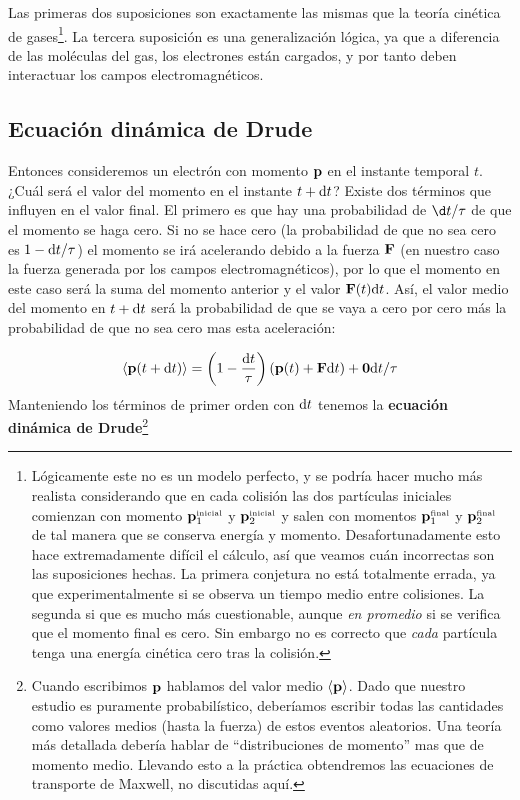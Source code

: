 Las primeras dos suposiciones son exactamente las mismas que la teoría cinética de gases\footnote{Lógicamente este no es un modelo perfecto, y se podría hacer mucho más realista considerando que en cada colisión las dos partículas iniciales comienzan con momento $\mathbf{p}_1^{\text{{\tiny inicial}}}$ y $\mathbf{p}_2^{\text{{\tiny inicial}}}$ y salen con momentos $\mathbf{p}_1^{\text{{\tiny final}}}$ y $\mathbf{p}_2^{\text{{\tiny final}}}$ de tal manera que se conserva energía y momento. Desafortunadamente esto hace extremadamente difícil el cálculo, así que veamos cuán incorrectas son las suposiciones hechas. La primera conjetura no está totalmente errada, ya que experimentalmente si se observa un tiempo medio entre colisiones. La segunda si que es mucho más cuestionable, aunque \textit{en promedio} si se verifica  que el momento final es cero. Sin embargo no es correcto que \textit{cada} partícula tenga una energía cinética cero tras la colisión.}. La tercera suposición es una generalización lógica, ya que a diferencia de las moléculas del gas, los electrones están cargados, y por tanto deben interactuar los campos electromagnéticos.

\subsection{Ecuación dinámica de Drude}

Entonces consideremos un electrón con momento $\mathbf{p}$ en el instante temporal $t$. ¿Cuál será el valor del momento en el instante $t+\mathrm{d} t$? Existe dos términos que influyen en el valor final. El primero es que hay una probabilidad de $\d t/\tau$ de que el momento se haga cero. Si no se hace cero (la probabilidad de que no sea cero es $1-\mathrm{d} t / \tau$) el momento se irá acelerando debido a la fuerza $\mathbf{F}$ (en nuestro caso la fuerza generada por los campos electromagnéticos), por lo que el momento en este caso será la suma del momento anterior y el valor $\mathbf{F}(t)\mathrm{d} t$. Así, el valor medio del momento en $t+\mathrm{d} t$ será la probabilidad de que se vaya a cero por cero más la probabilidad de que no sea cero mas esta aceleración:

\begin{equation}
	\langle \mathbf{p} (t + \mathrm{d} t) \rangle = \left( 1- \frac{\mathrm{d} t}{\tau} \right) \left( \mathbf{p} (t)+\mathbf{F} \mathrm{d} t \right) + \mathbf{0} \mathrm{d} t / \tau
\end{equation}
Manteniendo los términos de primer orden con $\mathrm{d} t$ tenemos la \textbf{ecuación dinámica de Drude}\footnote{Cuando escribimos $\mathbf{p}$ hablamos del valor medio $\langle \mathbf{p} \rangle$. Dado que nuestro estudio es puramente probabilístico, deberíamos escribir todas las cantidades como valores medios (hasta la fuerza) de estos eventos aleatorios. Una teoría más detallada debería hablar de ``distribuciones de momento'' mas que de momento medio. Llevando esto a la práctica obtendremos las ecuaciones de transporte de Maxwell, no discutidas aquí.}

